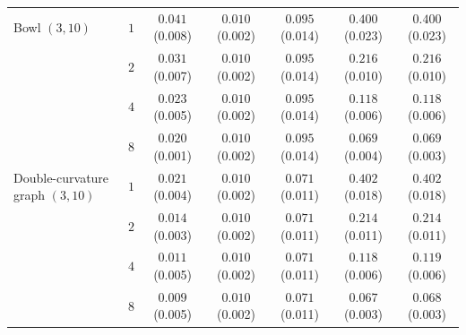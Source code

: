 \begin{tabular}{lcccccc}
\midrule
Bowl $(3,10)$ & $1$ & $0.041$ \scriptsize(0.008) & $0.010$ \scriptsize(0.002) & $0.095$ \scriptsize(0.014) & $0.400$ \scriptsize(0.023) & $0.400$ \scriptsize(0.023) \\
 & $2$ & $0.031$ \scriptsize(0.007) & $0.010$ \scriptsize(0.002) & $0.095$ \scriptsize(0.014) & $0.216$ \scriptsize(0.010) & $0.216$ \scriptsize(0.010) \\
 & $4$ & $0.023$ \scriptsize(0.005) & $0.010$ \scriptsize(0.002) & $0.095$ \scriptsize(0.014) & $0.118$ \scriptsize(0.006) & $0.118$ \scriptsize(0.006) \\
 & $8$ & $0.020$ \scriptsize(0.001) & $0.010$ \scriptsize(0.002) & $0.095$ \scriptsize(0.014) & $0.069$ \scriptsize(0.004) & $0.069$ \scriptsize(0.003) \\
\midrule
Double-curvature graph $(3,10)$ & $1$ & $0.021$ \scriptsize(0.004) & $0.010$ \scriptsize(0.002) & $0.071$ \scriptsize(0.011) & $0.402$ \scriptsize(0.018) & $0.402$ \scriptsize(0.018) \\
 & $2$ & $0.014$ \scriptsize(0.003) & $0.010$ \scriptsize(0.002) & $0.071$ \scriptsize(0.011) & $0.214$ \scriptsize(0.011) & $0.214$ \scriptsize(0.011) \\
 & $4$ & $0.011$ \scriptsize(0.005) & $0.010$ \scriptsize(0.002) & $0.071$ \scriptsize(0.011) & $0.118$ \scriptsize(0.006) & $0.119$ \scriptsize(0.006) \\
 & $8$ & $0.009$ \scriptsize(0.005) & $0.010$ \scriptsize(0.002) & $0.071$ \scriptsize(0.011) & $0.067$ \scriptsize(0.003) & $0.068$ \scriptsize(0.003) \\
\bottomrule
\end{tabular}
